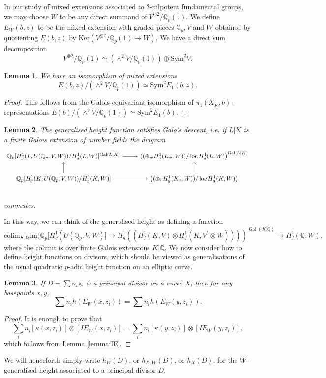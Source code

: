 \documentclass[11pt]{amsart}
\def\Q{\mathbb Q}
\newcommand{\Sym}{\mathrm{Sym}}
\theoremstyle{plain}
\newtheorem{lemma}{Lemma}
\theoremstyle{definition}
\DeclareMathOperator{\Gal}{Gal}
\newcommand{\colim}{\mathrm{colim}}
\DeclareMathOperator{\loc}{loc}
\newcommand{\Ker}{\mathrm{Ker}}
\begin{document}
In our study of mixed extensions associated to $2$-nilpotent fundamental groups, we may choose $W$ to be any direct summand of $V^{\otimes 2}/\Q _p (1)$. We define $E_W (b,z)$ to be the mixed extension with graded pieces $\Q _p ,V$ and $W$ obtained by quotienting $E(b,z)$ by $\Ker (V^{\otimes 2}/\Q _p (1)\to W)$. We have a direct sum decomposition 
\[
V^{\otimes 2}/\Q _p (1)\simeq (\wedge ^2 V/\Q _p (1))\oplus \Sym ^2 V.
\]
\begin{lemma}\label{lemma:sym_boring}
We have an isomorphism of mixed extensions
\[
E(b,z)/(\wedge ^2 V/\Q _p (1))\simeq \Sym ^2 E_1 (b,z).
\]
\end{lemma}
\begin{proof}
This follows from the Galois equivariant isomorphism of $\pi _1 (X_{\overline{K}},b)$-representations $E(b)/(\wedge ^2 V/\Q _p (1))\simeq \Sym ^2 E_1 (b)$.
\end{proof}

\begin{lemma}
The generalised height function satisfies Galois descent, i.e. if $L|K$ is a finite Galois extension of number fields the diagram 
\[
\begin{tikzcd}
\Q _p [H^1 _g (L,U(\Q _p ,V,W))/H^1 _g (L,W)]^{\Gal (L|K)} \arrow[r]           & \big( (\oplus _{w}H^1 _g (L_w ,W))/\loc H^1 _g (L ,W) \big) ^{\Gal (L|K)}           \\
\Q _p [H^1 _g (K,U(\Q _p ,V,W))/H^1 _g (K,W)] \arrow[r]   \arrow[u]        & \big( (\oplus _{v}H^1 _g (K_v ,W))/\loc H^1 _g (K ,W) \big)   \arrow[u] \\
\end{tikzcd}
\]
commutes.
\end{lemma}
In this way, we can think of the generalised height as defining a function
\[
\colim _{K|\Q }\mathrm{Im}(\Q _p [H^1 _g (U(\Q _p,V,W)]\to H^1 _g ((H^1 _f (K ,V)\otimes H^1 _f (K,V^* \otimes W))))^{\Gal (K|\Q )}\to H^1 _f (\Q ,W),
\]
where the colimit is over finite Galois extensions $K|\Q $. We now consider how to define height functions on divisors, which should be viewed as generalisations of the usual quadratic $p$-adic height function on an elliptic curve.

\begin{lemma}
If $D=\sum n_i z_i $ is a principal divisor on a curve $X$, then for any basepoints $x,y$,
\[
\sum n_i h(E_W (x,z_i ))=\sum n_i h(E_W (y,z_i )).
\]
\end{lemma}
\begin{proof}
It is enough to prove that
\[
\sum _i n_i [\kappa (x,z_i )]\otimes [IE_W (x,z_i )]=\sum _i n_i [\kappa (y,z_i )]\otimes [IE_W (y,z_i )],
\]
which follows from Lemma \ref{lemma:IE}.
\end{proof}
We will henceforth simply write $h_W (D)$, or $h_{X,W}(D)$, or $h_X (D)$, for the $W$-generalised height associated to a principal divisor $D$.
\end{document}
